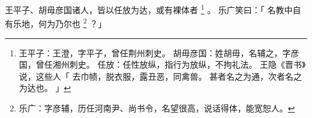 
\switchcolumn*[\section{}]

王平子、胡毋彦国诸人，皆以任放为达，或有裸体者%
\footnote{%
    王平子：王澄，字平子，曾任荆州刺史。
    胡毋彦国：姓胡毋，名辅之，字彦国，曾任湘州刺史。
    任放：任性放纵，指行为放纵，不拘礼法。
          王隐《晋书》说，这些人「
              去巾帻，脱衣服，露丑恶，同禽兽。
              甚者名之为通，次者名之为达也。
          」
}%
。
乐广笑曰：「
    名教中自有乐地，何为乃尔也%
    \footnote{%
        乐广：字彦辅，历任河南尹、尚书令，名望很高，说话得体，能宽恕人。
    }%
？」

\switchcolumn



